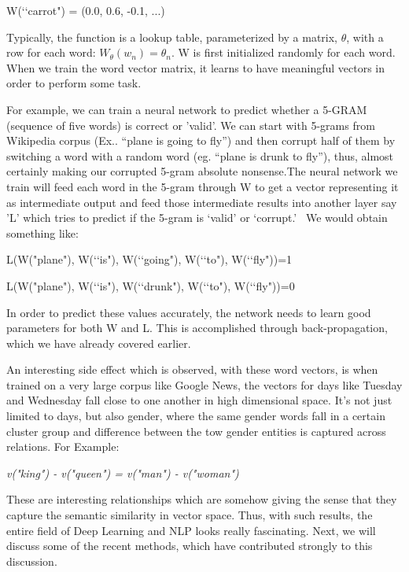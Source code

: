 W(‘‘carrot") = (0.0, 0.6, -0.1, ...)
\newline

Typically, the function is a lookup table, parameterized by a matrix, $\theta$, with a row for each word: ${W}_{\theta}({w}_{n})={\theta}_{n}$. W is first initialized randomly for each word. When we train the word vector matrix, it learns to have meaningful vectors in order to perform some task.
\newline

For example, we can train a neural network to predict whether a 5-GRAM (sequence of five words) is correct or 'valid'.  We can start with 5-grams from Wikipedia corpus (Ex.. “plane is going to fly”) and then corrupt half of them by switching a word with a random word (eg. “plane is drunk to fly”), thus, almost certainly making our corrupted 5-gram absolute nonsense.The neural network we train will feed each word in the 5-gram through W to get a vector representing it as intermediate output and feed those intermediate results into another layer say 'L' which tries to predict if the 5-gram is ‘valid’ or ‘corrupt.’~\parencite{bottou} We would obtain something like:
\newline

L(W("plane"), W(‘‘is"), W(‘‘going"), W(‘‘to"), W(‘‘fly"))=1
\newline

L(W("plane"), W(‘‘is"), W(‘‘drunk"), W(‘‘to"), W(‘‘fly"))=0
\newline

In order to predict these values accurately, the network needs to learn good parameters for both W and L. This is accomplished through back-propagation, which we have already covered earlier.
\newline

An interesting side effect which is observed, with these word vectors, is when trained on a very large corpus like Google News, the vectors for days like Tuesday and Wednesday fall close to one another in high dimensional space.  It's not just limited to days, but also gender, where the same gender words fall in a certain cluster group and difference between the tow gender entities is captured across relations. For Example:
\begin{center}
\textit{v("king") - v("queen") = v("man") - v("woman")}
\end{center}
These are interesting relationships which are somehow giving the sense that they capture the semantic similarity in vector space. Thus, with such results, the entire field of Deep Learning and NLP looks really fascinating. Next, we will discuss some of the recent methods, which have contributed strongly to this discussion.

